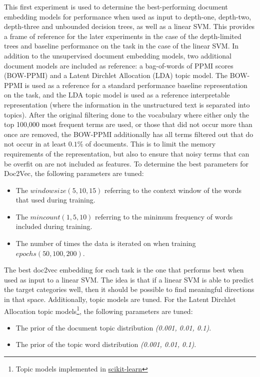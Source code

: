 This first experiment is used to determine the best-performing document embedding models for performance when used as input to depth-one, depth-two, depth-three and unbounded decision trees, as well as a linear SVM.  This provides a frame of reference for the later experiments in the case of the depth-limited trees and baseline performance on the task in the case of the linear SVM. In addition to the unsupervised document embedding models, two additional document models are included as reference: a bag-of-words of PPMI scores (BOW-PPMI) and a Latent Dirchlet Allocation (LDA) topic model. The BOW-PPMI is used as a reference for a standard performance baseline representation on the task, and the LDA topic model is used as a reference interpretable representation (where the information in the unstructured text is separated into topics). After the original filtering done to the vocabulary where either only the top 100,000 most frequent terms are used, or those that did not occur more than once are removed, the BOW-PPMI additionally has all terms filtered out that do not occur in at least $0.1\%$ of documents. This is to limit the memory requirements of the representation, but also to ensure that noisy terms that can be overfit on are not included as features.   To determine the best parameters for Doc2Vec, the following parameters are tuned: 

\begin{itemize}
	\item The ${window size} (5, 10, 15)$ referring to the context window of the words that  used   during training.
	\item The ${min count} (1, 5, 10)$ referring to the minimum frequency of words  included during training.
	\item The number of times the data is iterated on when training ${epochs} (50, 100, 200)$.
\end{itemize}

The best doc2vec embedding for each task is the one that performs best when used as input to a linear SVM. The idea is that if a linear SVM is able to predict the target categories well, then it should be possible to find meaningful directions in that space. Additionally,  topic models are tuned. For the Latent Dirchlet Allocation topic models\footnote{Topic models implemented in \href{https://scikit-learn.org/stable/modules/generated/sklearn.decomposition.LatentDirichletAllocation.html}{scikit-learn}}, the following parameters are tuned:

\begin{itemize}
\item The prior of the document topic distribution \textit{ (0.001, 0.01, 0.1)}.
\item The prior of the topic word distribution \textit{ (0.001, 0.01, 0.1)}.
\end{itemize}


